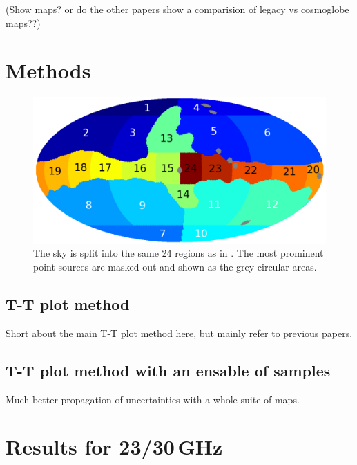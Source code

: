 \documentclass[twocolumn]{../../common/aa}
\begin{document}
(Show maps? or do the other papers show a comparision of legacy vs cosmoglobe maps??)


\section{Methods}
\label{sec:methods}

\begin{figure}
        \centering
        \includegraphics[width=\linewidth]{figures/utnymaske_tall_converted.pdf}
        \caption{The sky is split into the same 24 regions as in \citet{fuskeland2014}. The most prominent point sources are masked out and shown as the grey circular areas.
        }
        \label{fig:regions}
\end{figure}


\subsection{T-T plot method}
\label{sec:ttplot}
Short about the main T-T plot method here, but mainly refer to previous papers.


\subsection{T-T plot method with an ensable of samples}
\label{sec:ttplot_cosmoglobe}
Much better propagation of uncertainties with a whole suite of maps.


\section{Results for 23/30\,GHz}
\label{sec:results23-30}
\end{document}
